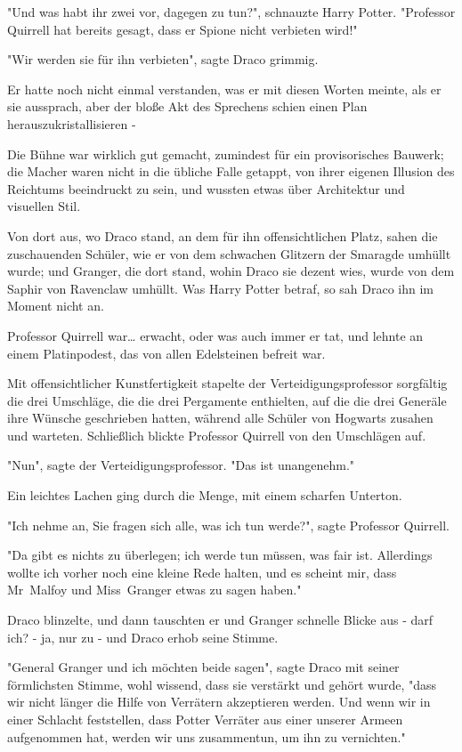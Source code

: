 {"Und was habt ihr zwei vor, dagegen zu tun?", schnauzte Harry Potter. "Professor Quirrell hat bereits gesagt, dass er Spione nicht verbieten wird!"

"Wir werden sie für ihn verbieten", sagte Draco grimmig.

Er hatte noch nicht einmal verstanden, was er mit diesen Worten meinte, als er sie aussprach, aber der bloße Akt des Sprechens schien einen Plan herauszukristallisieren -

Die Bühne war wirklich gut gemacht, zumindest für ein provisorisches Bauwerk; die Macher waren nicht in die übliche Falle getappt, von ihrer eigenen Illusion des Reichtums beeindruckt zu sein, und wussten etwas über Architektur und visuellen Stil.

Von dort aus, wo Draco stand, an dem für ihn offensichtlichen Platz, sahen die zuschauenden Schüler, wie er von dem schwachen Glitzern der Smaragde umhüllt wurde; und Granger, die dort stand, wohin Draco sie dezent wies, wurde von dem Saphir von Ravenclaw umhüllt. Was Harry Potter betraf, so sah Draco ihn im Moment nicht an.

Professor Quirrell war… erwacht, oder was auch immer er tat, und lehnte an einem Platinpodest, das von allen Edelsteinen befreit war.

Mit offensichtlicher Kunstfertigkeit stapelte der Verteidigungsprofessor sorgfältig die drei Umschläge, die die drei Pergamente enthielten, auf die die drei Generäle ihre Wünsche geschrieben hatten, während alle Schüler von Hogwarts zusahen und warteten. Schließlich blickte Professor Quirrell von den Umschlägen auf.

"Nun", sagte der Verteidigungsprofessor. "Das ist unangenehm."

Ein leichtes Lachen ging durch die Menge, mit einem scharfen Unterton.

"Ich nehme an, Sie fragen sich alle, was ich tun werde?", sagte Professor Quirrell.

"Da gibt es nichts zu überlegen; ich werde tun müssen, was fair ist. Allerdings wollte ich vorher noch eine kleine Rede halten, und es scheint mir, dass Mr~Malfoy und Miss~Granger etwas zu sagen haben."

Draco blinzelte, und dann tauschten er und Granger schnelle Blicke aus - darf ich? - ja, nur zu - und Draco erhob seine Stimme.

"General Granger und ich möchten beide sagen", sagte Draco mit seiner förmlichsten Stimme, wohl wissend, dass sie verstärkt und gehört wurde, "dass wir nicht länger die Hilfe von Verrätern akzeptieren werden. Und wenn wir in einer Schlacht feststellen, dass Potter Verräter aus einer unserer Armeen aufgenommen hat, werden wir uns zusammentun, um ihn zu vernichten."

}
